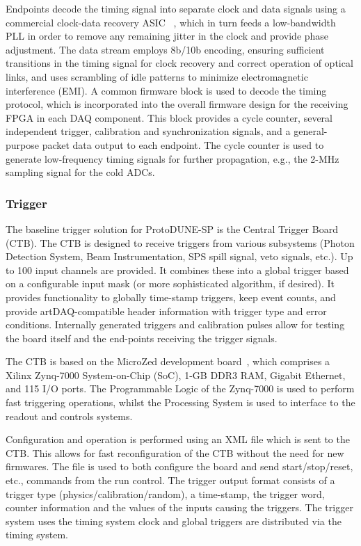 Endpoints decode the timing signal into separate clock and data
signals using a commercial clock-data recovery ASIC ~\cite{siliconlabs:Si5344}, which in turn
feeds a low-bandwidth PLL  in order to remove any remaining jitter in
the clock and provide phase adjustment. The data stream employs 8b/10b
encoding, ensuring sufficient transitions in the timing signal for clock
recovery and correct operation of optical links, and uses scrambling
of idle patterns to minimize electromagnetic interference (EMI).
 A common firmware block is used to
decode the timing protocol, which is incorporated into the overall
firmware design for the receiving FPGA in each DAQ component. This
block provides a cycle counter, several independent trigger, calibration and 
synchronization signals, and a general-purpose packet data output to each endpoint.
The cycle counter is used to generate low-frequency timing signals for
further propagation, e.g., the 2-MHz sampling signal for the cold ADCs.

\subsubsection{Trigger}

The baseline trigger solution for ProtoDUNE-SP is the Central Trigger Board
(CTB). The CTB is designed to receive triggers from various subsystems
(Photon Detection System, Beam Instrumentation, SPS spill signal, veto
signals, etc.).  Up to 100 input channels are provided.  It combines
these into a global trigger based on a configurable input mask (or
more sophisticated algorithm, if desired).  It provides functionality
to globally time-stamp triggers, keep event counts, and provide artDAQ-compatible 
 header information with trigger type and error conditions.
Internally generated triggers and calibration pulses allow for testing
the board itself and the end-points receiving the trigger signals.

The CTB is based on the MicroZed development board~\cite{avnet:microzed}, which comprises a
Xilinx Zynq-7000 System-on-Chip (SoC), 1-GB DDR3 RAM, Gigabit Ethernet,
and 115 I/O ports.  The Programmable Logic of the Zynq-7000 is used to
perform fast triggering operations, whilst the Processing System is used
to interface to the readout and controls systems.

Configuration and operation is performed using an XML file which is sent
to the CTB.  This allows for fast reconfiguration of the CTB without
the need for new firmwares.  The file is used to both configure the board
and send start/stop/reset, etc., commands from the run control.
The trigger output format consists of a trigger type (physics/calibration/random),
a time-stamp, the trigger word, counter information and the values 
of the inputs causing the triggers.  
The trigger system uses the timing system clock and global triggers are
distributed via the timing system.  


